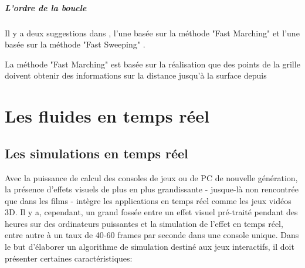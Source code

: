 \documentclass[11pt]{report}
\begin{document}
\subsubsection*{L'ordre de la boucle}

Il y a deux suggestions dans \cite{tsai-2002}, l'une basée sur la méthode "Fast Marching" \cite{sethian-1996} \cite{tsitsiklis-1995} et l'une basée sur la méthode "Fast Sweeping" \cite{zhao-2005}. 

La méthode "Fast Marching" est basée sur la réalisation que des points de la grille doivent obtenir des informations sur la distance jusqu'à la surface depuis 




\part{Les fluides en temps réel}

\chapter{Les simulations en temps réel}

Avec la puissance de calcul des consoles de jeux ou de PC de nouvelle génération, la présence d'effets visuels de plus en plus grandissante - jusque-là non rencontrée que dans les films - intègre les applications en temps réel comme les jeux vidéos 3D. Il y a, cependant, un grand fossée entre un effet visuel pré-traité pendant des heures sur des ordinateurs puissantes et la simulation de l'effet en temps réel, entre autre à un taux de 40-60 frames par seconde dans une console unique. Dans le but d'élaborer un algorithme de simulation destiné aux jeux interactifs, il doit présenter certaines caractéristiques: 
\end{document}
